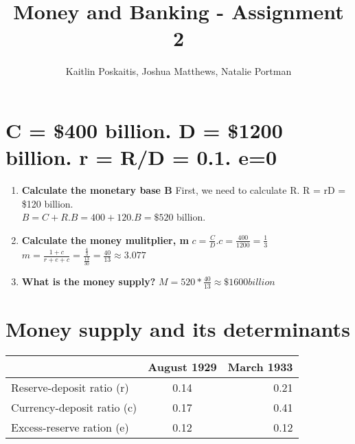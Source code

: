 \documentclass[12pt]{article}
\title{\bf Money and Banking - Assignment 2}
\author{Kaitlin Poskaitis, Joshua Matthews, Natalie Portman}
\date{}
\begin{document}
\maketitle

\section{C = \$400 billion. D = \$1200 billion. r = R/D = 0.1. e=0}

\begin{enumerate}
	\item {\bf Calculate the monetary base B}
	First, we need to calculate R. R = rD = \$120 billion.\\
	$B = C + R. B = 400 + 120. B = \$520$ billion. 
	\item {\bf Calculate the money mulitplier, m}
	$c = \frac{C}{D}. c = \frac{400}{1200} = \frac{1}{3}$
	$m = \frac{1+c}{r+e+c} = \frac{\frac{4}{3}}{\frac{13}{30}} = 
	\frac{40}{13} \approx 3.077$
	\item {\bf What is the money supply?}
	$M = 520*\frac{40}{13} \approx  \$1600 billion$
\end{enumerate}

\section{Money supply and its determinants}

\begin{tabular}{|l |c| r|}
	\hline
	& August 1929 & March 1933 \\ \hline
	Reserve-deposit ratio (r) & 0.14 & 0.21 \\ \hline
	Currency-deposit ratio (c) & 0.17 & 0.41 \\ \hline
	Excess-reserve ration (e) & 0.12 & 0.12 \\ \hline
\end{tabular}
\end{document}
